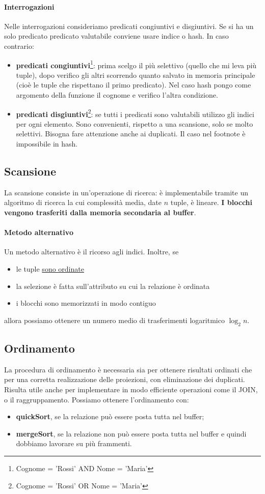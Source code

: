 \paragraph{Interrogazioni} Nelle interrogazioni consideriamo predicati congiuntivi e disgiuntivi. Se si ha un solo predicato predicato valutabile conviene usare indice o hash. In caso contrario:
\begin{itemize}
	\item \textbf{predicati congiuntivi}\footnote{Cognome = 'Rossi' AND Nome = 'Maria'}: prima scelgo il più selettivo (quello che mi leva più tuple), dopo verifico gli altri scorrendo quanto salvato in memoria principale (cioè le tuple che rispettano il primo predicato). Nel caso hash pongo come argomento della funzione il cognome e verifico l'altra condizione.
	\item \textbf{predicati disgiuntivi}\footnote{Cognome = 'Rossi' OR Nome = 'Maria'}: se tutti i predicati sono valutabili utilizzo gli indici per ogni elemento. Sono convenienti, rispetto a una scansione, solo se molto selettivi. Bisogna fare attenzione anche ai duplicati. Il caso nel footnote è impossibile in hash.
\end{itemize}

\subsection{Scansione}
La scansione consiste in un'operazione di ricerca: è implementabile tramite un algoritmo di ricerca la cui complessità media, date $n$ tuple, è lineare. \textbf{I blocchi vengono trasferiti dalla memoria secondaria al buffer}.
\paragraph{Metodo alternativo} Un metodo alternativo è il ricorso agli indici. Inoltre, se 
\begin{itemize}
	\item le tuple \underline{sono ordinate}
	\item la selezione è fatta sull'attributo su cui la relazione è ordinata 
	\item i blocchi sono memorizzati in modo contiguo
\end{itemize}
allora possiamo ottenere un numero medio di trasferimenti logaritmico $\log_2 n$.

\subsection{Ordinamento}
La procedura di ordinamento è necessaria sia per ottenere risultati ordinati che per una corretta realizzazione delle proiezioni, con eliminazione dei duplicati. Risulta utile anche per implementare in modo efficiente operazioni come il JOIN, o il raggruppamento. Possiamo ottenere l'ordinamento con:
\begin{itemize}
	\item \textbf{quickSort}, se la relazione può essere posta tutta nel buffer;
	\item \textbf{mergeSort}, se la relazione non può essere posta tutta nel buffer e quindi dobbiamo lavorare su più frammenti.
\end{itemize}

